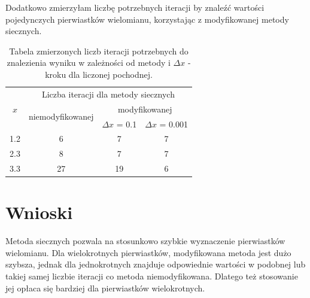 \documentclass{article}
\begin{document}
\par Dodatkowo zmierzyłam liczbę potrzebnych iteracji by znaleźć wartości pojedynczych pierwiastków wielomianu, korzystając z modyfikowanej metody siecznych.
\begin{table}[H]
\begin{center}
\begin{tabular}{|c||c|c|c|}
\multirow{3}{*}{$x$} & \multicolumn{3}{c|}{Liczba iteracji dla metody siecznych}              \\ \cline{2-4} 
                   & \multirow{2}{*}{niemodyfikowanej} & \multicolumn{2}{c|}{modyfikowanej} \\ \cline{3-4} 
                   &                                   & $\Delta x$ = 0.1    & $\Delta x$ = 0.001   \\ \hline
1.2                & 6                                 & 7               & 7                \\ \hline
2.3                & 8                                 & 7               & 7                \\ \hline
3.3                & 27                                & 19              & 6                
\end{tabular}
\end{center}
\caption{Tabela zmierzonych liczb iteracji potrzebnych do znalezienia wyniku w zależności od metody i $\Delta x$ - kroku dla liczonej pochodnej. }
\end{table}

\section{Wnioski}
Metoda siecznych pozwala na stosunkowo szybkie wyznaczenie pierwiastków wielomianu. Dla wielokrotnych pierwiastków, modyfikowana metoda jest dużo szybsza, jednak dla jednokrotnych znajduje odpowiednie wartości w podobnej lub takiej samej liczbie iteracji co metoda niemodyfikowana. Dlatego też stosowanie jej opłaca się bardziej dla pierwiastków wielokrotnych. 
\end{document}
